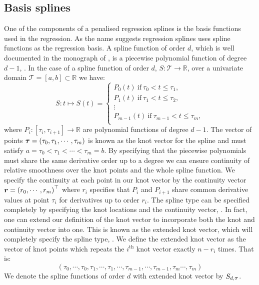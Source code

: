  \subsection{Basis splines  \label{ssec:basis_splines}}
 One of the components of a penalised regression splines is the basis functions used in the regression.
 As the name suggests regression splines uses spline functions as the regression basis.
 A spline function of order $d$,  which is well documented in the monograph of \citeauthor{de_boor_practical_2001}, is a piecewise polynomial function of degree $d-1$, \cite{de_boor_practical_2001}. In the case of a spline function of order $d$, $S: \mathcal{T} \to \mathbb{R}$, over a univariate domain $\mathcal{T} = \left[a, b\right] \subset \mathbb{R}$ we have: 
 \begin{equation}
 	S: t \mapsto S(t) = \begin{cases}
 		P_0(t)~\text{if}~ \tau_0 < t  \leq \tau_1,\\
 		P_1(t)~\text{if}~ \tau_1 < t  \leq \tau_2,\\
 		\vdots \\
 		P_{m-1}(t)~\text{if}~ \tau_{m-1} < t  \leq \tau_m,\\
 	\end{cases}
 \end{equation}
where $P_i: \left[\tau_i, \tau_{i+1}\right] \to \mathbb{R}$ are polynomial functions of degree $d-1$.
The vector of points $\bm{{\tau}} = \left(\tau_0, \tau_1, \cdots, \tau_m \right)$ is known as the knot vector for the spline and must satisfy $a=\tau_0 < \tau_1 < \cdots < \tau_m = b$.
By specifying that the piecewise polynomials must share the same derivative order up to a degree we can ensure continuity of relative smoothness over the knot points and the whole spline function.
We specify the continuity at each point in our knot vector by the continuity vector $\bm{{r}}=\left( r_0,\cdots, r_m \right)^\top$ where $r_i$ specifies that $P_i$ and $P_{i+1}$ share common derivative values at point $\tau_i$ for derivatives up to order $r_i$.
The spline type can be specified completely by specifying the knot locations and the continuity vector, \citep{de_boor_practical_2001}.
In fact, one can extend our definition of the knot vector to incorporate both the knot and continuity vector into one.
This is known as the extended knot vector, which will completely specify the spline type, \citep{de_boor_practical_2001}.
We define the extended knot vector as the vector of knot points which repeats the $i^\text{th}$ knot vector exactly $n - r_i$ times. That is:
\begin{equation*}
	(\tau_0,\cdots,\tau_0, \tau_1, \cdots, \tau_1 ,\cdots, \tau_{m-1},\cdots, \tau_{m-1}, \tau_m \cdots, \tau_m)
\end{equation*}
We denote the spline functions of order $d$ with extended knot vector by $S_{d, \bm{{\tau}}}$. 

